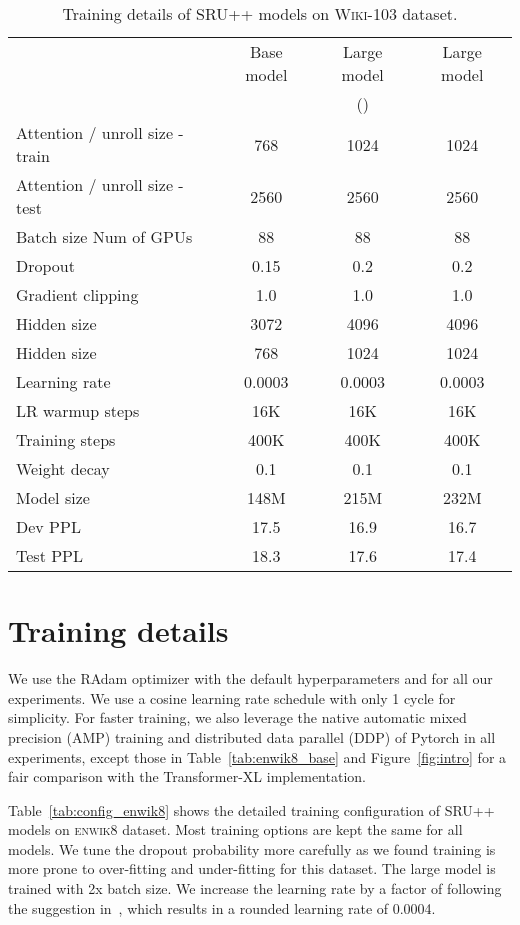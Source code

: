 \documentclass[11pt,a4paper]{article}
\begin{document}
\begin{table*}[!h]
\centering
\begin{tabular}{lccc}
\hline
 & Base model & Large model & Large model \\
 & & () & \\
\hline
Attention / unroll size - train & 768 & 1024 & 1024 \\
Attention / unroll size - test & 2560 & 2560 & 2560\\
Batch size  Num of GPUs & 88 & 88 & 88 \\
Dropout & 0.15 & 0.2 & 0.2 \\
Gradient clipping & 1.0 & 1.0 & 1.0 \\
Hidden size  & 3072 & 4096 & 4096 \\
Hidden size  & 768 & 1024 & 1024\\
Learning rate & 0.0003 & 0.0003 & 0.0003\\
LR warmup steps & 16K & 16K & 16K \\
Training steps & 400K & 400K & 400K \\
Weight decay & 0.1 & 0.1 & 0.1 \\
\hline
Model size & 148M & 215M & 232M \\
Dev PPL & 17.5 & 16.9 & 16.7\\
Test PPL & 18.3 & 17.6 & 17.4\\
\bottomrule
\end{tabular}
\caption{Training details of SRU++ models on \textsc{Wiki-103} dataset.}
\label{tab:config_wiki103}
\end{table*}

\section{Training details}
\label{sec:appendix:train_details}

We use the RAdam optimizer with the default hyperparameters  and  for all our experiments.
We use a cosine learning rate schedule with only 1 cycle for simplicity.
For faster training, we also leverage the native automatic mixed precision (AMP) training and distributed data parallel (DDP) of Pytorch in all experiments, except those in Table~\ref{tab:enwik8_base} and Figure~\ref{fig:intro} for a fair comparison with the Transformer-XL implementation.

Table~\ref{tab:config_enwik8} shows the detailed training configuration of SRU++ models on \textsc{enwik8} dataset.
Most training options are kept the same for all models. 
We tune the dropout probability more carefully as we found training is more prone to over-fitting and under-fitting for this dataset.
The large model is trained with 2x batch size.
We increase the learning rate by a factor of  following the suggestion in~\citet{hoffer2017}, which results in a rounded learning rate of 0.0004.
\end{document}
